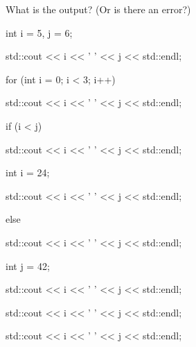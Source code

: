 What is the output? (Or is there an error?)



\begin{console}

int i = 5, j = 6;

std::cout << i << ' ' << j << std::endl;

for (int i = 0; i < 3; i++)

{

      std::cout << i << ' ' << j << std::endl;

      if (i < j)

      {      

           std::cout << i << ' ' << j << std::endl;

           int i = 24;

           std::cout << i << ' ' << j << std::endl;

      }

      else

      {

           std::cout << i << ' ' << j << std::endl;

           int j = 42; 

           std::cout << i << ' ' << j << std::endl;

      }

      std::cout << i << ' ' << j << std::endl;

}

std::cout << i << ' ' << j << std::endl;

\end{console}

